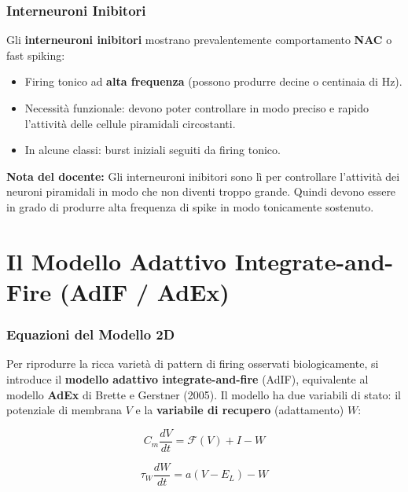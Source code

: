 \subsubsection{Interneuroni Inibitori}

Gli \textbf{interneuroni inibitori} mostrano prevalentemente comportamento \textbf{NAC} o fast spiking:

\begin{itemize}
    \item Firing tonico ad \textbf{alta frequenza} (possono produrre decine o centinaia di Hz).
    \item Necessità funzionale: devono poter controllare in modo preciso e rapido l'attività delle cellule piramidali circostanti.
    \item In alcune classi: burst iniziali seguiti da firing tonico.
\end{itemize}

\begin{tcolorbox}[colback=gray!5, colframe=gray!40, arc=2mm, boxrule=0.5pt]
\textbf{Nota del docente:} Gli interneuroni inibitori sono lì per controllare l'attività dei neuroni piramidali in modo che non diventi troppo grande. Quindi devono essere in grado di produrre alta frequenza di spike in modo tonicamente sostenuto.
\end{tcolorbox}

\section{Il Modello Adattivo Integrate-and-Fire (AdIF / AdEx)}

\subsubsection{Equazioni del Modello 2D}

Per riprodurre la ricca varietà di pattern di firing osservati biologicamente, si introduce il \textbf{modello adattivo integrate-and-fire} (AdIF), equivalente al modello \textbf{AdEx} di Brette e Gerstner (2005). Il modello ha due variabili di stato: il potenziale di membrana $V$ e la \textbf{variabile di recupero} (adattamento) $W$:

\begin{equation}
C_m \frac{dV}{dt} = \mathcal{F}(V) + I - W
\end{equation}

\begin{equation}
\tau_W \frac{dW}{dt} = a(V - E_L) - W
\end{equation}

